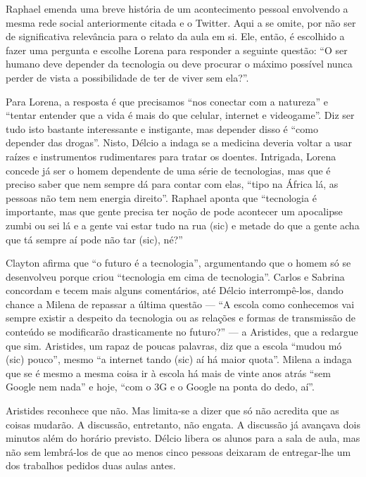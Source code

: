 \documentclass[12pt,a4paper]{article}
\begin{document}
	Raphael emenda uma breve história de um acontecimento pessoal envolvendo 
	a mesma rede social anteriormente citada e o Twitter. Aqui a se omite, 
	por não ser de significativa relevância para o relato da aula em si. 
	Ele, então, é escolhido a fazer uma pergunta e escolhe Lorena para 
	responder a seguinte questão: ``O ser humano deve depender da tecnologia 
	ou deve procurar o máximo possível nunca perder de vista a possibilidade 
	de ter de viver sem ela?''. 
	
	Para Lorena, a resposta é que precisamos ``nos conectar com a natureza'' 
	e ``tentar entender que a vida é mais do que celular, internet e 
	videogame''. Diz ser tudo isto bastante interessante e instigante, mas 
	depender disso é ``como depender das drogas''. Nisto, Délcio a indaga se 
	a medicina deveria voltar a usar raízes e instrumentos rudimentares para 
	tratar os doentes. Intrigada, Lorena concede já ser o homem dependente 
	de uma série de tecnologias, mas que é preciso saber que nem sempre dá 
	para contar com elas, ``tipo na África lá, as pessoas não tem nem energia 
	direito''. Raphael aponta que ``tecnologia é importante, mas que gente 
	precisa ter noção de pode acontecer um apocalipse zumbi ou sei lá e a 
	gente vai estar tudo na rua (sic) e metade do que a gente acha que tá 
	sempre 	aí pode não tar (sic), né?''
	
	Clayton afirma que ``o futuro é a tecnologia'', argumentando que o homem
	só se desenvolveu porque criou ``tecnologia em cima de tecnologia''. 
	Carlos e Sabrina concordam e tecem mais alguns comentários, até Délcio
	interrompê-los, dando chance a Milena de repassar a última questão --- 
	``A escola como conhecemos vai sempre existir a despeito da tecnologia 
	ou as relações e formas de transmissão de conteúdo se modificarão 
	drasticamente no futuro?'' --- a Aristides, que a redargue que sim. 
	Aristides, um rapaz de poucas palavras, diz que a escola ``mudou mó (sic)
	pouco'', mesmo ``a internet tando (sic) aí há maior quota''. Milena a 
	indaga que se é mesmo a mesma coisa ir à escola há mais de vinte anos 
	atrás ``sem Google nem nada'' e hoje, ``com o 3G e o Google na ponta 
	do dedo, aí''. 
	
	Aristides reconhece que não. Mas limita-se a dizer que só não acredita 
	que as coisas mudarão. A discussão, entretanto, não engata. A discussão 
	já avançava dois minutos além do horário previsto. Délcio libera os 
	alunos para a sala de aula, mas não sem lembrá-los de que ao menos cinco 
	pessoas deixaram de entregar-lhe um dos trabalhos pedidos duas aulas antes. 
	
\end{document}
